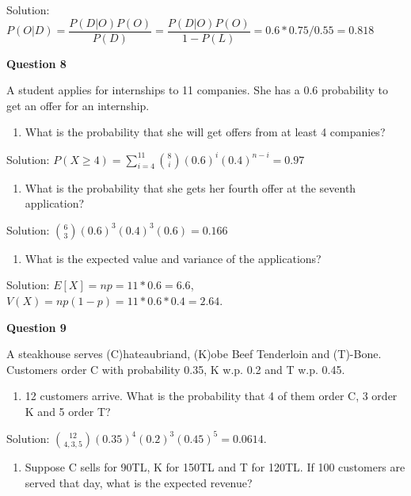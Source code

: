 \documentclass[]{book}
\providecommand{\tightlist}{%
  \setlength{\itemsep}{0pt}\setlength{\parskip}{0pt}}
\theoremstyle{definition}
\theoremstyle{definition}
\theoremstyle{definition}
\theoremstyle{remark}
\begin{document}
Solution:
\(P(O|D) = \dfrac{P(D|O)P(O)}{P(D)} = \dfrac{P(D|O)P(O)}{1-P(L)} = 0.6*0.75/0.55 = 0.818\)

\textbf{Question 8}

A student applies for internships to 11 companies. She has a 0.6
probability to get an offer for an internship.

\begin{enumerate}
\def\labelenumi{\alph{enumi})}
\tightlist
\item
  What is the probability that she will get offers from at least 4
  companies?
\end{enumerate}

Solution:
\(P(X \ge 4) = \sum_{i=4}^{11} \binom{8}{i} (0.6)^i(0.4)^{n-i} = 0.97\)

\begin{enumerate}
\def\labelenumi{\alph{enumi})}
\setcounter{enumi}{1}
\tightlist
\item
  What is the probability that she gets her fourth offer at the seventh
  application?
\end{enumerate}

Solution: \(\binom{6}{3} (0.6)^3(0.4)^{3}(0.6) = 0.166\)

\begin{enumerate}
\def\labelenumi{\alph{enumi})}
\setcounter{enumi}{2}
\tightlist
\item
  What is the expected value and variance of the applications?
\end{enumerate}

Solution: \(E[X] = np = 11*0.6 = 6.6\),
\(V(X) = np(1-p) = 11*0.6*0.4 = 2.64\).

\textbf{Question 9}

A steakhouse serves (C)hateaubriand, (K)obe Beef Tenderloin and
(T)-Bone. Customers order C with probability 0.35, K w.p. 0.2 and T w.p.
0.45.

\begin{enumerate}
\def\labelenumi{\alph{enumi})}
\tightlist
\item
  12 customers arrive. What is the probability that 4 of them order C, 3
  order K and 5 order T?
\end{enumerate}

Solution: \(\binom{12}{4,3,5}(0.35)^4(0.2)^3(0.45)^5 = 0.0614\).

\begin{enumerate}
\def\labelenumi{\alph{enumi})}
\setcounter{enumi}{1}
\tightlist
\item
  Suppose C sells for 90TL, K for 150TL and T for 120TL. If 100
  customers are served that day, what is the expected revenue?
\end{enumerate}
\end{document}
